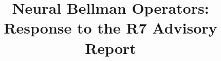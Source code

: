 \documentclass[ecta,draft]{econsocart}
\begin{document}
\begin{frontmatter}
\title{Neural Bellman Operators: Response to the R7 Advisory Report}
\begin{aug}
\author[id=au1,addressref={add1}]{~}
\address[id=add1]{Peking University}
\end{aug}
\end{frontmatter}


\end{document}
